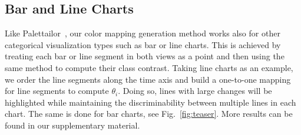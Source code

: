 


\subsection{Bar and Line Charts}
\label{subsec:ext}
Like Palettailor~\cite{Lu21}, our color mapping generation method works also for other categorical visualization types such as bar or line charts. This is achieved by treating each bar or line segment in both views as a point and then using the same method to compute their class contrast.
Taking line charts as an example,  we order the line segments along the time axis and build a one-to-one mapping for line segments to compute $\theta_i$.
Doing so, lines with large changes will be highlighted while maintaining the discriminability between multiple lines in each chart. The same is done for bar charts, see Fig.~\ref{fig:teaser}.
More results can be found in our supplementary material.


